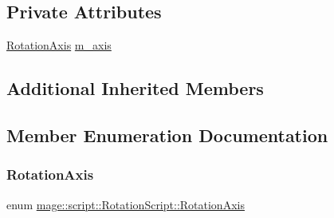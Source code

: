 \subsection*{Private Attributes}
\begin{DoxyCompactItemize}
\item 
\hyperlink{classmage_1_1script_1_1_rotation_script_aa8a91cc8c771fc777ffb5e8a28c43ad2}{Rotation\+Axis} \hyperlink{classmage_1_1script_1_1_rotation_script_a334c42c3ca6af6c2713c98ba4151cdbb}{m\+\_\+axis}
\end{DoxyCompactItemize}
\subsection*{Additional Inherited Members}


\subsection{Member Enumeration Documentation}
\hypertarget{classmage_1_1script_1_1_rotation_script_aa8a91cc8c771fc777ffb5e8a28c43ad2}{}\label{classmage_1_1script_1_1_rotation_script_aa8a91cc8c771fc777ffb5e8a28c43ad2} 
\subsubsection{\texorpdfstring{Rotation\+Axis}{RotationAxis}}
{\footnotesize\ttfamily enum \hyperlink{classmage_1_1script_1_1_rotation_script_aa8a91cc8c771fc777ffb5e8a28c43ad2}{mage\+::script\+::\+Rotation\+Script\+::\+Rotation\+Axis}\hspace{0.3cm}{\ttfamily [strong]}}

